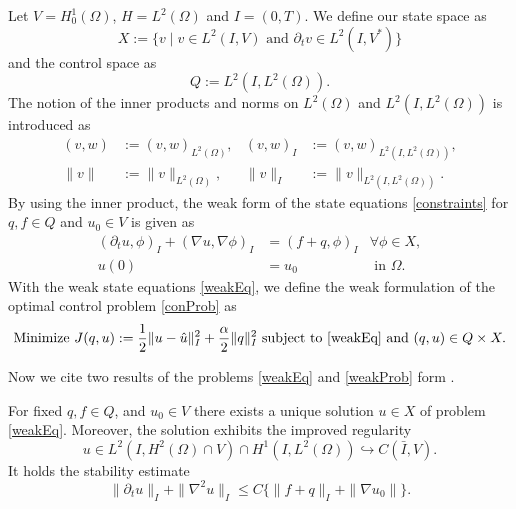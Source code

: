 Let $V=H_0^1(\Omega)$, $H=L^2(\Omega)$ and $I=(0,T)$. We define our state space as
\begin{displaymath}
X:=\{v\mid v\in L^2(I,V)\text{ and }\partial_tv\in L^2(I,V^*)\}
\end{displaymath}
and the control space as
\begin{displaymath}
Q:=L^2(I,L^2(\Omega)).
\end{displaymath}
The notion of the inner products and norms on $L^2(\Omega)$ and $L^2(I,L^2(\Omega))$ is introduced as
\begin{align*}
(v,w)&:=(v,w)_{L^2(\Omega)},&(v,w)_I&:=(v,w)_{L^2(I,L^2(\Omega))},\\
\|v\|&:=\|v\|_{L^2(\Omega)},&\|v\|_I&:=\|v\|_{L^2(I,L^2(\Omega))}.
\end{align*}
By using the inner product, the weak form of the state equations \eqref{constraints} for $q,f\in Q$ and $u_0\in V$ is given as
\begin{equation}
\label{weakEq}
\begin{aligned}
	(\partial_tu,\phi)_I+(\nabla u,\nabla\phi)_I&=(f+q,\phi)_I&\forall\phi\in X,\\
	u(0)&=u_0&\text{ in }\Omega.
\end{aligned}
\end{equation}
With the weak state equations \eqref{weakEq}, we define the weak formulation of the optimal control problem \eqref{conProb} as
\begin{equation}
\label{weakProb}
\text{Minimize }J(q,u):=\frac{1}{2}\|u-\hat{u}\|_I^2+\frac{\alpha}{2}\|q\|_I^2\text{ subject to \eqref{weakEq} and }(q,u)\in Q\times X.
\end{equation}

Now we cite two results of the problems \eqref{weakEq} and \eqref{weakProb} form \cite{doi:10.1137/070694016}.

\begin{prop}
\label{uniqueU}
For fixed $q,f\in Q$, and $u_0\in V$ there exists a unique solution $u\in X$ of problem \eqref{weakEq}. Moreover, the solution exhibits the improved regularity
\begin{displaymath}
u\in L^2(I,H^2(\Omega)\cap V)\cap H^1(I,L^2(\Omega))\hookrightarrow C(\bar{I},V).
\end{displaymath}
It holds the stability estimate
\begin{displaymath}
\|\partial_tu\|_I+\|\nabla^2u\|_I\leq C\{\|f+q\|_I+\|\nabla u_0\|\}.
\end{displaymath}
\end{prop}

